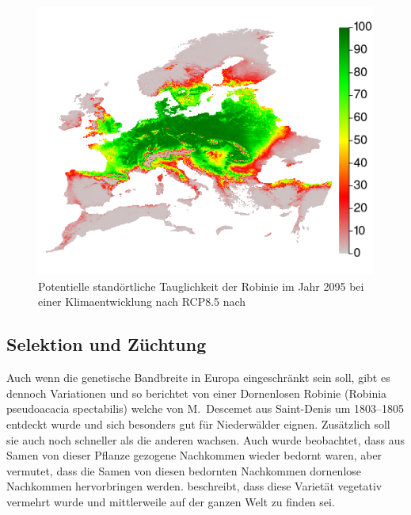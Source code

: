 \documentclass[twocolumn]{scrartcl}
\begin{document}
\begin{figure}[htbp]
  \centering
  \includegraphics[width=.9\linewidth]{./bild/potentialEuropaZukunft85}
  \caption{Potentielle standörtliche Tauglichkeit der Robinie im Jahr 2095 bei einer Klimaentwicklung nach RCP8.5 nach \cite{mauri2022baumartenZukunft}}
  \label{fig:verbreitungEuPotZukunft}
\end{figure}

\subsection{Selektion und Züchtung}

Auch wenn die genetische Bandbreite in Europa eingeschränkt sein soll,
gibt es dennoch Variationen und so berichtet
\citet[S.~259--260]{Michaux1813arbres} von einer Dornenlosen Robinie
(Robinia pseudoacacia spectabilis) welche von M.~Descemet aus
Saint-Denis um 1803--1805 entdeckt wurde und sich besonders gut für
Niederwälder eignen. Zusätzlich soll sie auch noch schneller als die
anderen wachsen. Auch wurde beobachtet, dass aus Samen von dieser
Pflanze gezogene Nachkommen wieder bedornt waren, aber
\cite{Michaux1813arbres} vermutet, dass die Samen von diesen bedornten
Nachkommen dornenlose Nachkommen hervorbringen
werden. \citet[S.~173]{quatrefages1861robinie} beschreibt, dass diese
Varietät vegetativ vermehrt wurde und mittlerweile auf der ganzen Welt
zu finden sei.
\end{document}
